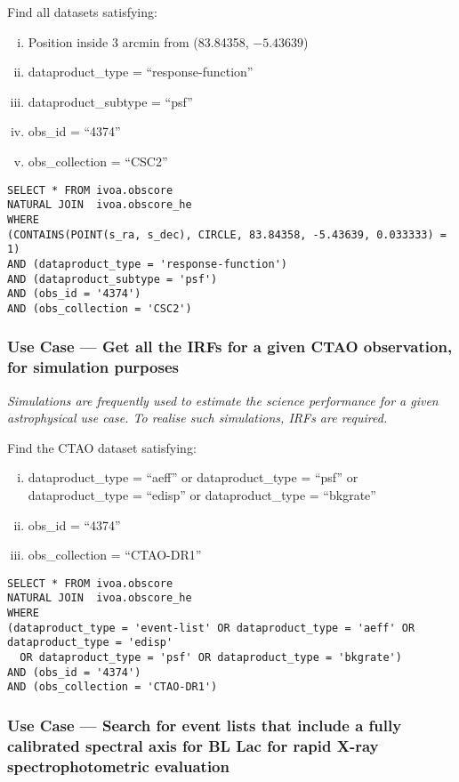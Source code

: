 \medskip
\noindent Find all datasets satisfying:
\begin{enumerate}[(i)]
  \item Position inside 3 arcmin from (83.84358, $-5.43639$)
  \item dataproduct\_type = ``response-function''
  \item dataproduct\_subtype = ``psf''
  \item obs\_id = ``4374''
  \item obs\_collection = ``CSC2''
\end{enumerate}

\begin{verbatim}
SELECT * FROM ivoa.obscore
NATURAL JOIN  ivoa.obscore_he 
WHERE
(CONTAINS(POINT(s_ra, s_dec), CIRCLE, 83.84358, -5.43639, 0.033333) = 1) 
AND (dataproduct_type = 'response-function')
AND (dataproduct_subtype = 'psf')
AND (obs_id = '4374')
AND (obs_collection = 'CSC2')
\end{verbatim}


\subsubsection{Use Case --- Get all the \glspl{IRF} for a given CTAO observation, for simulation purposes}

{\em Simulations are frequently used to estimate the science performance for a given astrophysical use case. To realise such simulations, \glspl{IRF} are required. \/ }

\medskip
\noindent Find the CTAO dataset satisfying:
\begin{enumerate}[(i)]
  \item dataproduct\_type = ``aeff'' or dataproduct\_type = ``psf'' or dataproduct\_type = ``edisp'' or dataproduct\_type = ``bkgrate''
  \item obs\_id = ``4374''
  \item obs\_collection = ``CTAO-DR1''
\end{enumerate}

\begin{verbatim}
SELECT * FROM ivoa.obscore
NATURAL JOIN  ivoa.obscore_he 
WHERE
(dataproduct_type = 'event-list' OR dataproduct_type = 'aeff' OR dataproduct_type = 'edisp' 
  OR dataproduct_type = 'psf' OR dataproduct_type = 'bkgrate')
AND (obs_id = '4374')
AND (obs_collection = 'CTAO-DR1')
\end{verbatim}


\subsubsection{Use Case --- Search for event lists that include a fully calibrated spectral axis for BL Lac for rapid X-ray spectrophotometric evaluation}

